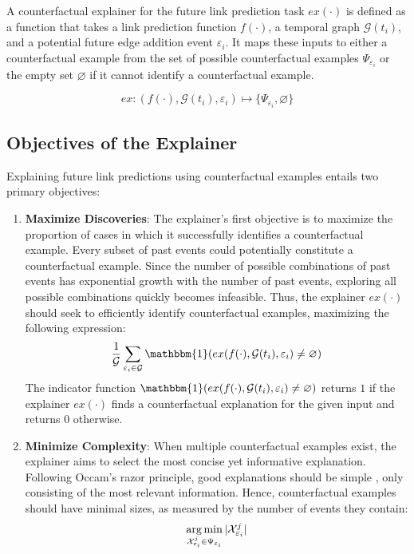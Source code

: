 A counterfactual explainer for the future link prediction task $ex(\cdot)$ is defined as a function that takes a link prediction function $f(\cdot)$, a temporal graph $\mathcal{G}(t_i)$, and a potential future edge addition event $\varepsilon_i$. It maps these inputs to either a counterfactual example from the set of possible counterfactual examples $\Psi_{\varepsilon_i}$ or the empty set $\varnothing$ if it cannot identify a counterfactual example.

\begin{equation}
    ex: (f(\cdot), \mathcal{G}(t_i), \varepsilon_i) \mapsto \{\Psi_{\varepsilon_i}, \varnothing\}
\end{equation}

\subsection{Objectives of the Explainer}
\label{s_ProblemFormulation_Objectives}

Explaining future link predictions using counterfactual examples entails two primary objectives:

\begin{enumerate}
    \item \textbf{Maximize Discoveries}: The explainer's first objective is to maximize the proportion of cases in which it successfully identifies a counterfactual example. Every subset of past events could potentially constitute a counterfactual example. Since the number of possible combinations of past events has exponential growth with the number of past events, exploring all possible combinations quickly becomes infeasible. Thus, the explainer $ex(\cdot)$ should seek to efficiently identify counterfactual examples, maximizing the following expression:
    \begin{equation}
        \label{e_maxExplanationRate}
        \frac{1}{\mathcal{G}} \sum_{\varepsilon_{i} \in \mathcal{G}} \mathbbm{1}(ex(f(\cdot), \mathcal{G}(t_i), \varepsilon_{i}) \neq \varnothing)
    \end{equation}
    The indicator function $\mathbbm{1}(ex(f(\cdot), \mathcal{G}(t_i), \varepsilon_{i}) \neq \varnothing)$ returns $1$ if the explainer $ex(\cdot)$ finds a counterfactual explanation for the given input and returns $0$ otherwise.
    \item \textbf{Minimize Complexity}: When multiple counterfactual examples exist, the explainer aims to select the most concise yet informative explanation. Following Occam's razor principle, good explanations should be simple \cite{yuan_explainability_2020, tan_learning_2022}, only consisting of the most relevant information. Hence, counterfactual examples should have minimal sizes, as measured by the number of events they contain:
    \begin{equation}
        \label{e_minCFExampleSize}
        \operatorname*{arg\,min}_{\mathcal{X}_{\varepsilon_i}^j \in \Psi_{\varepsilon_i}} |\mathcal{X}_{\varepsilon_i}^j|
    \end{equation}
\end{enumerate}

